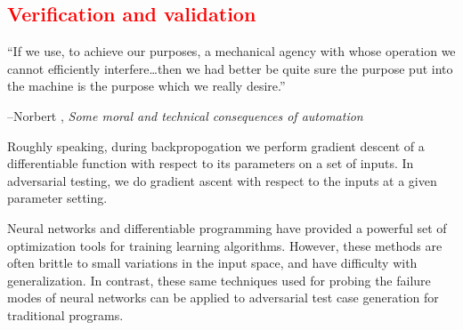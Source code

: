 \documentclass[12pt,initial,twoside,maitrise]{dms}
\newcommand{\rare}[1]{\textcolor{red}{#1}}
\numberwithin{equation}{section}
\numberwithin{table}{chapter}
\numberwithin{figure}{chapter}
\begin{document}
\rare{\chapter{Verification and validation}\label{ch:difftest}}

\setlength{\epigraphwidth}{0.80\textwidth}
\epigraph{``If we use, to achieve our purposes, a mechanical agency with whose operation we cannot efficiently interfere\ldots then we had better be quite sure the purpose put into the machine is the purpose which we really desire.''}{\begin{flushright}--Norbert \citet{wiener1960some}, \textit{Some moral and technical consequences of automation}~\end{flushright}}

Roughly speaking, during backpropogation we perform gradient descent of a differentiable function with respect to its parameters on a set of inputs. In adversarial testing, we do gradient ascent with respect to the inputs at a given parameter setting.

Neural networks and differentiable programming have provided a powerful set of optimization tools for training learning algorithms. However, these methods are often brittle to small variations in the input space, and have difficulty with generalization. In contrast, these same techniques used for probing the failure modes of neural networks can be applied to adversarial test case generation for traditional programs.
\end{document}
